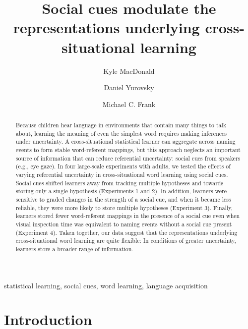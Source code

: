 \documentclass[authoryear, review]{elsarticle}
\date{}
\begin{document}
\begin{frontmatter}

\title{Social cues modulate the representations underlying cross-situational
learning}

\author[km]{Kyle MacDonald}
\author[dy]{Daniel Yurovsky}
\author[mcf]{Michael C. Frank}
\address{Department of Psychology, Stanford University, United States}


\begin{abstract}
Because children hear language in environments that contain many things
to talk about, learning the meaning of even the simplest word requires
making inferences under uncertainty. A cross-situational statistical
learner can aggregate across naming events to form stable word-referent
mappings, but this approach neglects an important source of information
that can reduce referential uncertainty: social cues from speakers
(e.g., eye gaze). In four large-scale experiments with adults, we tested
the effects of varying referential uncertainty in cross-situational word
learning using social cues. Social cues shifted learners away from
tracking multiple hypotheses and towards storing only a single
hypothesis (Experiments 1 and 2). In addition, learners were sensitive
to graded changes in the strength of a social cue, and when it became
less reliable, they were more likely to store multiple hypotheses
(Experiment 3). Finally, learners stored fewer word-referent mappings in
the presence of a social cue even when visual inspection time was
equivalent to naming events without a social cue present (Experiment 4).
Taken together, our data suggest that the representations underlying
cross-situational word learning are quite flexible: In conditions of
greater uncertainty, learners store a broader range of information.
\end{abstract}

\begin{keyword}
statistical learning, social cues, word learning, language acquisition
\end{keyword}

\end{frontmatter}

\newpage

\section{Introduction}\label{introduction}
\end{document}
